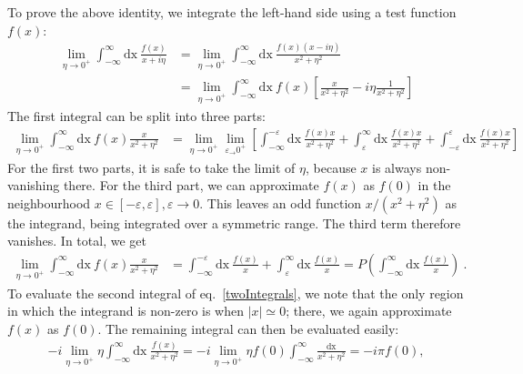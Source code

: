 To prove the above identity, we integrate the left-hand side using a test function \(f(x)\):
\begin{equation}\begin{aligned}\label{twoIntegrals}
	\lim_{\eta \to 0^+}\int_{-\infty}^{\infty} \text{dx}~\frac{f(x)}{x + i \eta} &= \lim_{\eta \to 0^+}\int_{-\infty}^{\infty} \text{dx}~\frac{f(x)\left( x - i\eta \right) }{x^2 + \eta^2} \\
																				 &= \lim_{\eta \to 0^+}\int_{-\infty}^{\infty} \text{dx}~f(x)\left[\frac{x}{x^2 + \eta^2} - i\eta\frac{1}{x^2 + \eta^2}\right]
\end{aligned}\end{equation}
The first integral can be split into three parts:
\begin{equation}\begin{aligned}
	\lim_{\eta \to 0^+}\int_{-\infty}^{\infty} \text{dx}~f(x)\frac{x}{x^2 + \eta^2} &= \lim_{\eta \to 0^+}\lim_{\varepsilon_\to 0^+}\left[\int_{-\infty}^{-\varepsilon} \text{dx}~\frac{f(x) x}{x^2 + \eta^2} + \int_{\varepsilon}^{\infty} \text{dx}~\frac{f(x)x}{x^2 + \eta^2} + \int_{-\varepsilon}^{\varepsilon} \text{dx}~\frac{f(x)x}{x^2 + \eta^2}\right]
\end{aligned}\end{equation}
For the first two parts, it is safe to take the limit of \(\eta\), because \(x\) is always non-vanishing there. For the third part, we can approximate \(f(x)\) as \(f(0)\) in the neighbourhood \(x \in \left[-\varepsilon, \varepsilon\right], \varepsilon \to 0 \). This leaves an odd function \(x/(x^2 + \eta^2)\) as the integrand, being integrated over a symmetric range. The third term therefore vanishes. In total, we get
\begin{equation}\begin{aligned}\label{integral1}
	\lim_{\eta \to 0^+}\int_{-\infty}^{\infty} \text{dx}~f(x)\frac{x}{x^2 + \eta^2} &= \int_{-\infty}^{-\varepsilon} \text{dx}~\frac{f(x)}{x} + \int_{\varepsilon}^{\infty} \text{dx}~\frac{f(x)}{x}  = P\left(\int_{-\infty}^{\infty} \text{dx}~\frac{f(x)}{x}\right) ~.
\end{aligned}\end{equation}
To evaluate the second integral of eq.~\ref{twoIntegrals}, we note that the only region in which the integrand is non-zero is when \(|x| \simeq 0\); there, we again approximate \(f(x)\) as \(f(0)\). The remaining integral can then be evaluated easily:
\begin{equation}\begin{aligned}\label{integral2}
	-i\lim_{\eta \to 0^+}\eta\int_{-\infty}^{\infty} \text{dx}~\frac{f(x)}{x^2 + \eta^2} = -i \lim_{\eta \to 0^+}\eta f(0)\int_{-\infty}^{\infty} \frac{\text{dx}}{x^2 + \eta^2} = -i \pi f(0),
\end{aligned}\end{equation}
